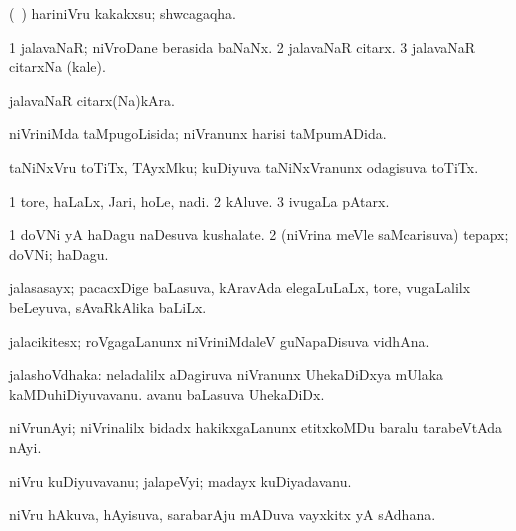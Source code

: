 \bentry
{} 
\gl{\nA}
\expl{}
\bmng
(\saMkiSx\ ) hariniVru kakakxsu; shwcagaqha. 
\emng
\eentry

\bentry
{} 
\gl{\nA}
\expl{}
\bmng
\bnum
\num{1} jalavaNaR; niVroDane berasida baNaNx. 
\num{2} jalavaNaR citarx. 
\num{3} jalavaNaR citarxNa (kale). 
\enum
\emng
\eentry

\bentry
{} 
\gl{\nA}
\expl{}
\bmng
jalavaNaR citarx(Na)kAra. 
\emng
\eentry

\bentry
{} 
\gl{\gu}
\expl{}
\bmng
niVriniMda taMpugoLisida; niVranunx harisi taMpumADida. 
\emng
\eentry

\bentry
{} 
\gl{\nA}
\expl{}
\bmng
taNiNxVru toTiTx, TAyxMku; kuDiyuva taNiNxVranunx odagisuva toTiTx. 
\emng
\eentry

\bentry
{} 
\gl{\nA}
\expl{}
\bmng
\bnum
\num{1} tore, haLaLx, Jari, hoLe, nadi. 
\num{2} kAluve. 
\num{3} ivugaLa pAtarx. 
\enum
\emng
\eentry

\bentry
{} 
\gl{\nA}
\expl{}
\bmng
\bnum
\num{1} doVNi yA haDagu naDesuva kushalate. 
\num{2} (niVrina meVle saMcarisuva) tepapx; doVNi; haDagu. 
\enum
\emng
\eentry

\bentry
{} 
\gl{\nA}
\expl{}
\bmng
jalasasayx; pacacxDige baLasuva, kAravAda elegaLuLaLx, tore, \mo vugaLalilx beLeyuva, sAvaRkAlika baLiLx. 
\emng
\eentry

\bentry
{} 
\gl{\nA}
\expl{}
\bmng
jalacikitesx; roVgagaLanunx niVriniMdaleV guNapaDisuva vidhAna. 
\emng
\eentry

\bentry
{} 
\gl{\nA}
\expl{}
\bmng
jalashoVdhaka: 
\banum
{} neladalilx aDagiruva niVranunx UhekaDiDxya mUlaka kaMDuhiDiyuvavanu. 
 avanu baLasuva UhekaDiDx. 
\eanum
\emng
\eentry

\bentry
{} 
\gl{\nA}
\expl{}
\bmng
niVrunAyi; niVrinalilx bidadx hakikxgaLanunx etitxkoMDu baralu tarabeVtAda nAyi. 
\emng
\eentry

\bentry
{} 
\gl{\nA}
\expl{}
\bmng
niVru kuDiyuvavanu; jalapeVyi; madayx kuDiyadavanu. 
\emng
\eentry

\bentry
{} 
\gl{\nA}
\expl{}
\bmng
niVru hAkuva, hAyisuva, sarabarAju mADuva vayxkitx yA sAdhana. 
\emng
\eentry

